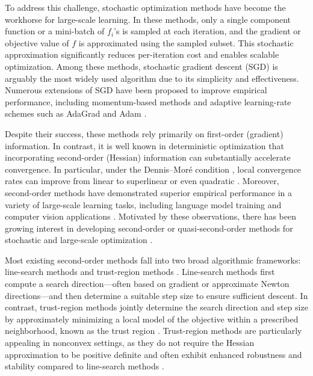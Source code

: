 \documentclass{article}
\theoremstyle{plain}
\theoremstyle{definition}
\theoremstyle{remark}
\begin{document}
To address this challenge, stochastic optimization methods have become the workhorse for large-scale learning. In these methods, only a single component function or a mini-batch of $f_i$'s is sampled at each iteration, and the gradient or objective value of $f$ is approximated using the sampled subset. This stochastic approximation significantly reduces per-iteration cost and enables scalable optimization. Among these methods, stochastic gradient descent (SGD) \citep{Robbins1951Stochastic,Bottou2018Optimization} is arguably the most widely used algorithm due to its simplicity and effectiveness. Numerous extensions of SGD have been proposed to improve empirical performance, including momentum-based methods \citep{Polyak1964Some,Liu2020Improved} and adaptive learning-rate schemes such as AdaGrad \citep{Duchi2011Adaptive} and Adam \citep{Kingma2014Adam}.

Despite their success, these methods rely primarily on first-order (gradient) information. In contrast, it is well known in deterministic optimization that incorporating second-order (Hessian) information can substantially accelerate convergence. In particular, under the Dennis--Moré condition \cite{Dennis1974characterization}, local convergence rates can improve from linear to superlinear or even quadratic \citep{Nocedal2006Numerical}. Moreover, second-order methods have demonstrated superior empirical performance in a variety of large-scale learning tasks, including language model training \citep{Liu2024Sophia} and computer vision applications \citep{Hollein20253dgs,lan20253dgs2}. Motivated by these observations, there has been growing interest in developing second-order or quasi-second-order methods for stochastic and large-scale optimization \citep{Byrd2011Use,Curtis2022Fully,Berahas2021Sequential,Fang2024Fully,Na2022adaptive}.

Most existing second-order methods fall into two broad algorithmic frameworks: line-search methods \citep[e.g.,][]{Berahas2021Sequential,Na2022adaptive} and trust-region methods \citep[e.g.,][]{Curtis2022Fully,Fang2024Fully}. Line-search methods first compute a search direction—often based on gradient or approximate Newton directions—and then determine a suitable step size to ensure sufficient descent. In contrast, trust-region methods jointly determine the search direction and step size by approximately minimizing a local model of the objective within a prescribed neighborhood, known as the trust region \citep{Conn2000Trust}. Trust-region methods are particularly appealing in nonconvex settings, as they do not require the Hessian approximation to be positive definite and often exhibit enhanced robustness and stability compared to line-search methods \citep[see, e.g.,][Chapter~4]{Nocedal2006Numerical}.
\end{document}
